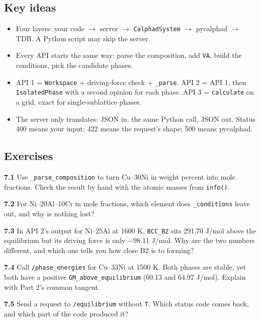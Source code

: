 \documentclass[12pt,a4paper]{article}
\begin{document}
\subsection*{Key ideas}
\begin{itemize}
\item Four layers: your code \(\rightarrow\) server \(\rightarrow\) \texttt{CalphadSystem} \(\rightarrow\) pycalphad \(\rightarrow\) TDB. A Python script may skip the server.
\item Every API starts the same way: parse the composition, add \texttt{VA}, build the conditions, pick the candidate phases.
\item API 1 = \texttt{Workspace} + driving-force check + \texttt{\_\allowbreak{}parse}. API 2 = API 1, then \texttt{IsolatedPhase} with a second opinion for each phase. API 3 = \texttt{calculate} on a grid, exact for single-sublattice phases.
\item The server only translates: JSON in, the same Python call, JSON out. Status 400 means your input; 422 means the request's shape; 500 means pycalphad.
\end{itemize}

\subsection*{Exercises}
\textbf{7.1} Use \texttt{\_\allowbreak{}parse\_\allowbreak{}composition} to turn Cu--30Ni in weight percent into mole fractions. Check the result by hand with the atomic masses from \texttt{info()}.

\textbf{7.2} For Ni--20Al--10Cr in mole fractions, which element does \texttt{\_\allowbreak{}conditions} leave out, and why is nothing lost?

\textbf{7.3} In API 2's output for Ni--25Al at 1600 K, \texttt{BCC\_\allowbreak{}B2} sits 291.70 J/mol above the equilibrium but its driving force is only \(-\)98.11 J/mol. Why are the two numbers different, and which one tells you how close B2 is to forming?

\textbf{7.4} Call \texttt{/\allowbreak{}phase\_\allowbreak{}energies} for Cu--33Ni at 1500 K. Both phases are stable, yet both have a positive \texttt{GM\_\allowbreak{}above\_\allowbreak{}equilibrium} (60.13 and 64.97 J/mol). Explain with Part 2's common tangent.

\textbf{7.5} Send a request to \texttt{/\allowbreak{}equilibrium} without \texttt{T}. Which status code comes back, and which part of the code produced it?
\end{document}
